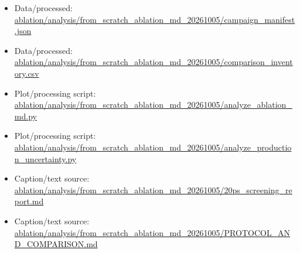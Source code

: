 \begin{itemize}[leftmargin=1.4em,noitemsep]
\item Data/processed: \begingroup\scriptsize\url{ablation/analysis/from_scratch_ablation_md_20261005/campaign_manifest.json}\endgroup
\item Data/processed: \begingroup\scriptsize\url{ablation/analysis/from_scratch_ablation_md_20261005/comparison_inventory.csv}\endgroup
\item Plot/processing script: \begingroup\scriptsize\url{ablation/analysis/from_scratch_ablation_md_20261005/analyze_ablation_md.py}\endgroup
\item Plot/processing script: \begingroup\scriptsize\url{ablation/analysis/from_scratch_ablation_md_20261005/analyze_production_uncertainty.py}\endgroup
\item Caption/text source: \begingroup\scriptsize\url{ablation/analysis/from_scratch_ablation_md_20261005/20ps_screening_report.md}\endgroup
\item Caption/text source: \begingroup\scriptsize\url{ablation/analysis/from_scratch_ablation_md_20261005/PROTOCOL_AND_COMPARISON.md}\endgroup
\end{itemize}
